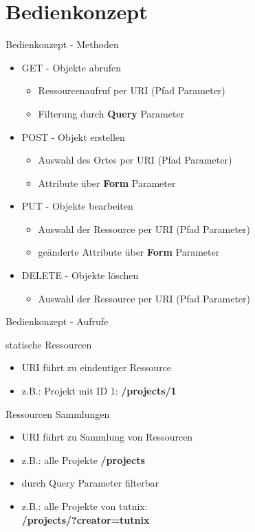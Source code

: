 \documentclass{beamer}
\begin{document}
	\section{Bedienkonzept}
		\begin{frame}{Bedienkonzept - Methoden}
			\begin{itemize}
				\item GET - Objekte abrufen
				\begin{itemize}
					\item Ressourcenaufruf per URI (Pfad Parameter)
					\item Filterung durch \textbf{Query} Parameter
				\end{itemize}
				\item POST - Objekt erstellen
					\begin{itemize}
						\item Auswahl des Ortes per URI (Pfad Parameter)
						\item Attribute über \textbf{Form} Parameter 
					\end{itemize}
				\item PUT - Objekte bearbeiten
					\begin{itemize}
						\item Auswahl der Ressource per URI (Pfad Parameter)
						\item geänderte Attribute über \textbf{Form} Parameter 
					\end{itemize}
				\item DELETE - Objekte löschen	
				\begin{itemize}
					\item Auswahl der Ressource per URI (Pfad Parameter) 
				\end{itemize}
			\end{itemize}
		\end{frame}
		
		\begin{frame}{Bedienkonzept - Aufrufe}
			\begin{block}{statische Ressourcen}
				\begin{itemize}
					\item URI führt zu eindeutiger Ressource
					\item z.B.: Projekt mit ID 1: \textbf{/projects/1}
				\end{itemize}
			\end{block}	
			
			\begin{block}{Ressourcen Sammlungen}
				\begin{itemize}
					\item URI führt zu Sammlung von Ressourcen
					\item z.B.: alle Projekte \textbf{/projects}
					\item durch Query Parameter filterbar
					\item z.B.: alle Projekte von tutnix:\\
					\textbf{/projects/?creator=tutnix}
				\end{itemize}
			\end{block}	
			
		\end{frame}
\end{document}
